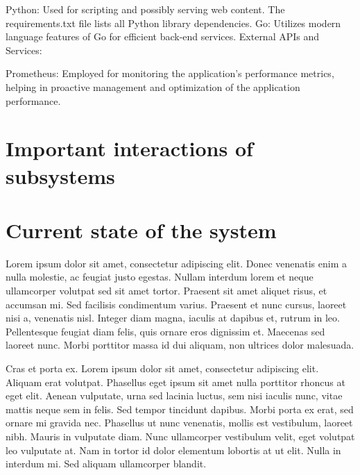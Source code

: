 \documentclass[12pt, a4paper, oneside]{book}
\begin{document}
\begin{spacing}{1.5}
Python: Used for scripting and possibly serving web content. The requirements.txt file lists all Python library dependencies.
Go: Utilizes modern language features of Go for efficient back-end services.
External APIs and Services:

Prometheus: Employed for monitoring the application’s performance metrics, helping in proactive management and optimization of the application performance.

\section{Important interactions of subsystems}

\section{Current state of the system}


Lorem ipsum dolor sit amet, consectetur adipiscing elit. Donec venenatis enim a nulla molestie, ac feugiat justo egestas. Nullam interdum lorem et neque ullamcorper volutpat sed sit amet tortor. Praesent sit amet aliquet risus, et accumsan mi. Sed facilisis condimentum varius. Praesent et nunc cursus, laoreet nisi a, venenatis nisl. Integer diam magna, iaculis at dapibus et, rutrum in leo. Pellentesque feugiat diam felis, quis ornare eros dignissim et. Maecenas sed laoreet nunc. Morbi porttitor massa id dui aliquam, non ultrices dolor malesuada.

Cras et porta ex. Lorem ipsum dolor sit amet, consectetur adipiscing elit. Aliquam erat volutpat. Phasellus eget ipsum sit amet nulla porttitor rhoncus at eget elit. Aenean vulputate, urna sed lacinia luctus, sem nisi iaculis nunc, vitae mattis neque sem in felis. Sed tempor tincidunt dapibus. Morbi porta ex erat, sed ornare mi gravida nec. Phasellus ut nunc venenatis, mollis est vestibulum, laoreet nibh. Mauris in vulputate diam. Nunc ullamcorper vestibulum velit, eget volutpat leo vulputate at. Nam in tortor id dolor elementum lobortis at ut elit. Nulla in interdum mi. Sed aliquam ullamcorper blandit.


\end{spacing}
\end{document}
